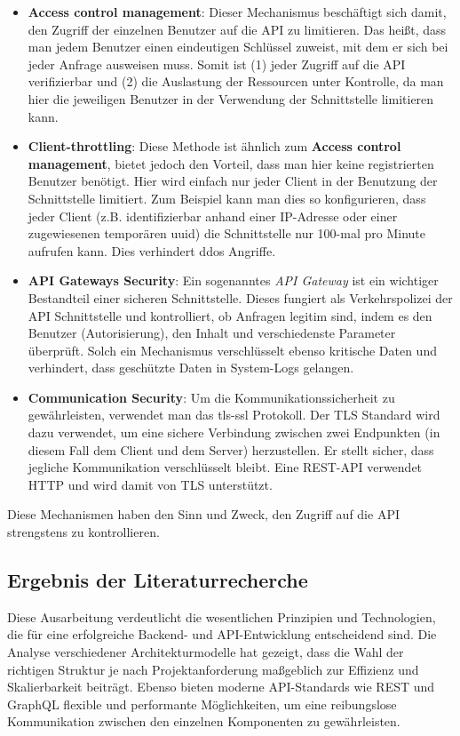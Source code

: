 \begin{itemize}
    \item \textbf{Access control management}: Dieser Mechanismus beschäftigt sich damit, den Zugriff der einzelnen Benutzer auf die API zu limitieren. Das heißt, dass man jedem Benutzer einen eindeutigen Schlüssel zuweist, mit dem er sich bei jeder Anfrage ausweisen muss. Somit ist (1) jeder Zugriff auf die API verifizierbar und (2) die Auslastung der Ressourcen unter Kontrolle, da man hier die jeweiligen Benutzer in der Verwendung der Schnittstelle limitieren kann.
    \item \textbf{Client-throttling}: Diese Methode ist ähnlich zum \textbf{Access control management}, bietet jedoch den Vorteil, dass man hier keine registrierten Benutzer benötigt. Hier wird einfach nur jeder Client in der Benutzung der Schnittstelle limitiert. Zum Beispiel kann man dies so konfigurieren, dass jeder Client (z.B. identifizierbar anhand einer IP-Adresse oder einer zugewiesenen temporären \gls{uuid}) die Schnittstelle nur 100-mal pro Minute aufrufen kann. Dies verhindert \gls{ddos} Angriffe.
    \item \textbf{API Gateways Security}: Ein sogenanntes \textit{API Gateway} ist ein wichtiger Bestandteil einer sicheren Schnittstelle. Dieses fungiert als Verkehrspolizei der API Schnittstelle und kontrolliert, ob Anfragen legitim sind, indem es den Benutzer (Autorisierung), den Inhalt und verschiedenste Parameter überprüft. Solch ein Mechanismus verschlüsselt ebenso kritische Daten und verhindert, dass geschützte Daten in System-Logs gelangen. 
    \item \textbf{Communication Security}: Um die Kommunikationssicherheit zu gewährleisten, verwendet man das \gls{tls-ssl} Protokoll. Der TLS Standard wird dazu verwendet, um eine sichere Verbindung zwischen zwei Endpunkten (in diesem Fall dem Client und dem Server) herzustellen. Er stellt sicher, dass jegliche Kommunikation verschlüsselt bleibt. Eine REST-API verwendet HTTP und wird damit von TLS unterstützt.  
\end{itemize}

Diese Mechanismen haben den Sinn und Zweck, den Zugriff auf die API strengstens zu kontrollieren.

\subsection{Ergebnis der Literaturrecherche}

Diese Ausarbeitung verdeutlicht die wesentlichen Prinzipien und Technologien, die für eine erfolgreiche Backend- und API-Entwicklung entscheidend sind. Die Analyse verschiedener Architekturmodelle hat gezeigt, dass die Wahl der richtigen Struktur je nach Projektanforderung maßgeblich zur Effizienz und Skalierbarkeit beiträgt. Ebenso bieten moderne API-Standards wie REST und GraphQL flexible und performante Möglichkeiten, um eine reibungslose Kommunikation zwischen den einzelnen Komponenten zu gewährleisten.
\newline

